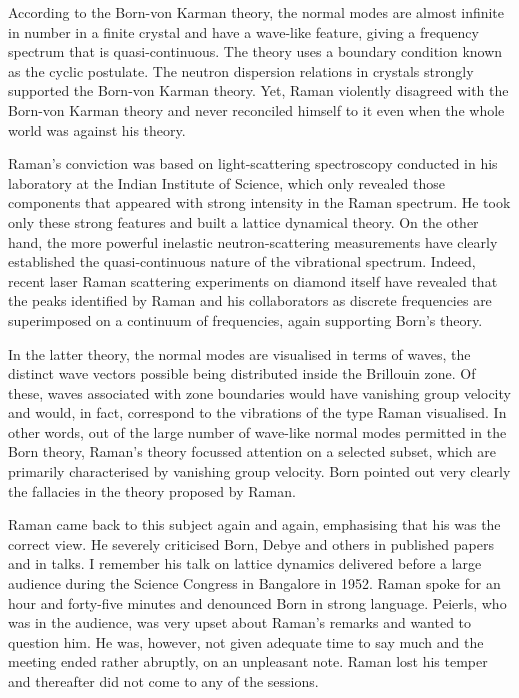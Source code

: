 According to the Born-von Karman theory, the normal mo\-des are almost infinite in number in a finite crystal and have a wave-like feature, giving a frequency spectrum that is quasi-continuous. The theory uses a boundary condition known as the cyclic postulate. The neutron dispersion relations in crystals strongly supported the Born-von Karman theory. Yet, Raman violently disagreed with the Born-von Karman theory and never reconciled himself to it even when the whole world was against his theory.

Raman's conviction was based on light-scattering spectro\-scopy conducted in his laboratory at the Indian Institute of Science, which only revealed those components that appeared with strong intensity in the Raman spectrum. He took only these strong features and built a lattice dynamical theory. On the other hand, the more powerful inelastic neutron-scattering measurements have clearly established the quasi-continuous nature of the vibrational spectrum. Indeed, recent laser Raman scattering experiments on diamond itself have revealed that the peaks identified by Raman and his collaborators as discrete frequencies are superimposed on a continuum of frequencies, again supporting Born's theory.

In the latter theory, the normal modes are visualised in terms of waves, the distinct wave vectors possible being distributed inside the Brillouin zone. Of these, waves associated with zone boundaries would have vanishing group velocity and would, in fact, correspond to the vibrations of the type Raman visualised. In other words, out of the large number of wave-like normal modes permitted in the Born theory, Raman's theory focussed attention on a selected subset, which are primarily characterised by vanishing group velocity. Born pointed out very clearly the fallacies in the theory proposed by Raman.

\newpage

Raman came back to this subject again and again, emphasising that his was the correct view. He severely criticised Born, Debye and others in published papers and in talks. I remember his talk on lattice dynamics delivered before a large audience during the Science Congress in Bangalore in 1952. Raman spoke for an hour and forty-five minutes and denounced Born in strong language. Peierls, who was in the audience, was very upset about Raman's remarks and wanted to question him. He was, however, not given adequate time to say much and the meeting ended rather abruptly, on an unpleasant note. Raman lost his temper and thereafter did not come to any of the sessions.

